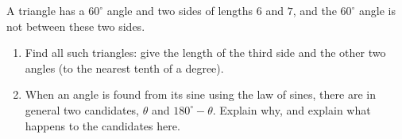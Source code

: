A triangle has a $60^\circ$ angle and two sides of lengths $6$ and $7$, and the $60^\circ$ angle is not between these two sides.
\begin{enumerate}
\item[(a)] Find all such triangles: give the length of the third side and the other two angles (to the nearest tenth of a degree).
\item[(b)] When an angle is found from its sine using the law of sines, there are in general two candidates, $\theta$ and $180^\circ-\theta$. Explain why, and explain what happens to the candidates here.
\end{enumerate}
